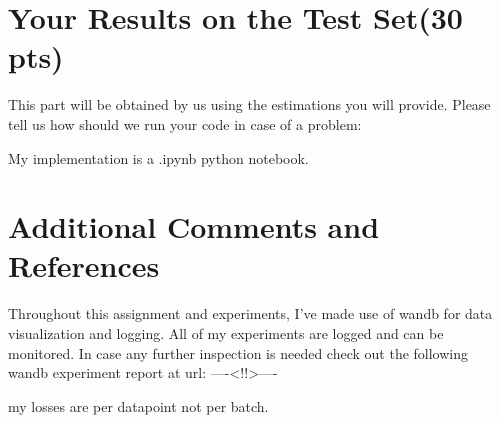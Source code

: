 \documentclass[12pt]{article}
\begin{document}
\section{Your Results on the Test Set(30 pts)}
This part will be obtained by us using the estimations you will provide. Please tell us how should we run your code in case of a problem:

\begin{center}
\raggedright
My implementation is a .ipynb python notebook.
    
\end{center}

\section{Additional Comments and References}

Throughout this assignment and experiments, I've made use of wandb for data visualization and logging.
All of my experiments are logged and can be monitored. In case any further inspection is needed check out the following wandb experiment report at url:
----<!!>----

my losses are per datapoint not per batch.
\end{document}
